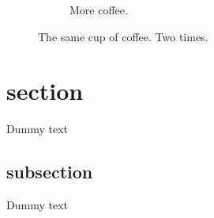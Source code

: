 \documentclass{article}
\begin{document}
\begin{figure}[h!]
\begin{subfigure}[b]{0.4\linewidth}
  \caption{More coffee.}
  \end{subfigure}
  \caption{The same cup of coffee. Two times.}
  \label{fig:coffee}
\end{figure}

\newpage
\tableofcontents
\section{section}
Dummy text
\subsection{subsection}
Dummy text
\end{document}

